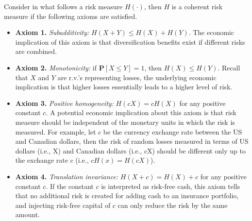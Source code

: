 \documentclass[12pt]{article}
\begin{document}
Consider in what follows a risk measure $H(\cdot)$, then $H$ is a coherent risk measure if the following axioms are satisfied.
\begin{itemize}
\item {\bf Axiom 1.} \textit{Subadditivity:} $H(X+Y)\leq H(X)+H(Y)$.  The economic implication of this axiom is that diversification benefits exist if different risks are combined.
\item {\bf Axiom 2.} \textit{Monotonicity:} if $\mathbf{P}[X\leq Y]=1$, then $H(X)\leq H(Y)$. Recall that $X$ and $Y$ are r.v.'s representing losses, the underlying economic implication is that higher losses essentially leads to a higher level of risk.

\item {\bf Axiom 3.} \textit{Positive homogeneity:} $H(cX)=cH(X)$ for any positive constant $c$.  A potential economic implication about this axiom is that risk measure should be independent of the monetary units in which the risk is measured.  For example, let $c$ be the currency exchange rate between the US and Canadian dollars, then the risk of random losses measured in terms of US dollars (i.e., X) and Canadian dollars (i.e., cX) should be different only up to the exchange rate $c$ (i.e., $cH(x)=H(cX)$).


\item {\bf Axiom 4.} \textit{Translation invariance:} $H(X+c)=H(X)+c$ for any positive constant $c$.  If the constant $c$ is interpreted as risk-free cash, this axiom tells that no additional risk is created for adding cash to an insurance portfolio, and injecting risk-free capital of $c$ can only reduce the risk by the same amount.
\bigskip
\end{itemize}
\end{document}
